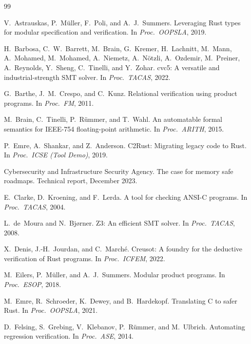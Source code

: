 \documentclass[11pt]{article}
\begin{document}
\begin{thebibliography}{99}

V.~Astrauskas, P.~M\"uller, F.~Poli, and A.~J.~Summers.
\newblock Leveraging Rust types for modular specification and verification.
\newblock In \emph{Proc.\ OOPSLA}, 2019.

H.~Barbosa, C.~W.~Barrett, M.~Brain, G.~Kremer, H.~Lachnitt, M.~Mann, A.~Mohamed, M.~Mohamed, A.~Niemetz, A.~N\"otzli, A.~Ozdemir, M.~Preiner, A.~Reynolds, Y.~Sheng, C.~Tinelli, and Y.~Zohar.
\newblock cvc5: A versatile and industrial-strength SMT solver.
\newblock In \emph{Proc.\ TACAS}, 2022.

G.~Barthe, J.~M.~Crespo, and C.~Kunz.
\newblock Relational verification using product programs.
\newblock In \emph{Proc.\ FM}, 2011.

M.~Brain, C.~Tinelli, P.~R\"ummer, and T.~Wahl.
\newblock An automatable formal semantics for IEEE-754 floating-point arithmetic.
\newblock In \emph{Proc.\ ARITH}, 2015.

P.~Emre, A.~Shankar, and Z.~Anderson.
\newblock C2Rust: Migrating legacy code to Rust.
\newblock In \emph{Proc.\ ICSE (Tool Demo)}, 2019.

{Cybersecurity and Infrastructure Security Agency}.
\newblock The case for memory safe roadmaps.
\newblock Technical report, December 2023.

E.~Clarke, D.~Kroening, and F.~Lerda.
\newblock A tool for checking {ANSI-C} programs.
\newblock In \emph{Proc.\ TACAS}, 2004.

L.~de~Moura and N.~Bj\o{}rner.
\newblock Z3: An efficient SMT solver.
\newblock In \emph{Proc.\ TACAS}, 2008.

X.~Denis, J.-H.~Jourdan, and C.~March{\'e}.
\newblock Creusot: A foundry for the deductive verification of {Rust} programs.
\newblock In \emph{Proc.\ ICFEM}, 2022.

M.~Eilers, P.~M\"uller, and A.~J.~Summers.
\newblock Modular product programs.
\newblock In \emph{Proc.\ ESOP}, 2018.

M.~Emre, R.~Schroeder, K.~Dewey, and B.~Hardekopf.
\newblock Translating C to safer Rust.
\newblock In \emph{Proc.\ OOPSLA}, 2021.

D.~Felsing, S.~Grebing, V.~Klebanov, P.~R\"ummer, and M.~Ulbrich.
\newblock Automating regression verification.
\newblock In \emph{Proc.\ ASE}, 2014.


\end{thebibliography}
\end{document}

